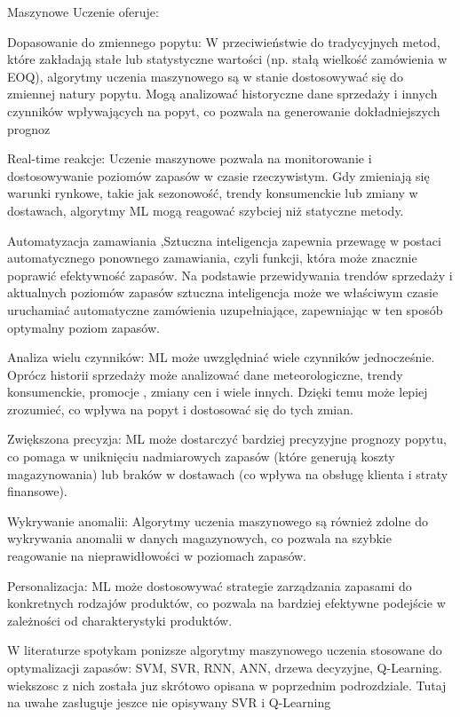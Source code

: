 Maszynowe Uczenie oferuje:

Dopasowanie do zmiennego popytu: W przeciwieństwie do tradycyjnych metod, które zakładają stałe lub statystyczne wartości (np. stałą wielkość zamówienia w EOQ), algorytmy uczenia maszynowego są w stanie dostosowywać się do zmiennej natury popytu. Mogą analizować historyczne dane sprzedaży i innych czynników wpływających na popyt, co pozwala na generowanie dokładniejszych prognoz

Real-time reakcje: Uczenie maszynowe pozwala na monitorowanie i dostosowywanie poziomów zapasów w czasie rzeczywistym. Gdy zmieniają się warunki rynkowe, takie jak sezonowość, trendy konsumenckie lub zmiany w dostawach, algorytmy ML mogą reagować szybciej niż statyczne metody.

Automatyzacja zamawiania ,Sztuczna inteligencja zapewnia przewagę w postaci automatycznego ponownego zamawiania, czyli funkcji, która może znacznie poprawić efektywność zapasów. Na podstawie przewidywania trendów sprzedaży i aktualnych poziomów zapasów sztuczna inteligencja może we właściwym czasie uruchamiać automatyczne zamówienia uzupełniające, zapewniając w ten sposób optymalny poziom zapasów.

Analiza wielu czynników: ML może uwzględniać wiele czynników jednocześnie. Oprócz historii sprzedaży może analizować dane meteorologiczne, trendy konsumenckie, promocje , zmiany cen i wiele innych. Dzięki temu może lepiej zrozumieć, co wpływa na popyt i dostosować się do tych zmian.

Zwiększona precyzja: ML może dostarczyć bardziej precyzyjne prognozy popytu, co pomaga w uniknięciu nadmiarowych zapasów (które generują koszty magazynowania) lub braków w dostawach (co wpływa na obsługę klienta i straty finansowe).

Wykrywanie anomalii: Algorytmy uczenia maszynowego są również zdolne do wykrywania anomalii w danych magazynowych, co pozwala na szybkie reagowanie na nieprawidłowości w poziomach zapasów.

Personalizacja: ML może dostosowywać strategie zarządzania zapasami do konkretnych rodzajów produktów, co pozwala na bardziej efektywne podejście w zależności od charakterystyki produktów.
\cite{linn2023}\cite{cdp2023}\cite{Matti2023}\cite{Had2023}

W literaturze spotykam ponizsze algorytmy maszynowego uczenia stosowane do optymalizacji zapasów:
SVM, SVR, RNN, ANN, drzewa decyzyjne, Q-Learning. wiekszosc z nich została juz skrótowo opisana w poprzednim podrozdziale. Tutaj na uwahe zasługuje jeszce nie opisywany SVR i Q-Learning

